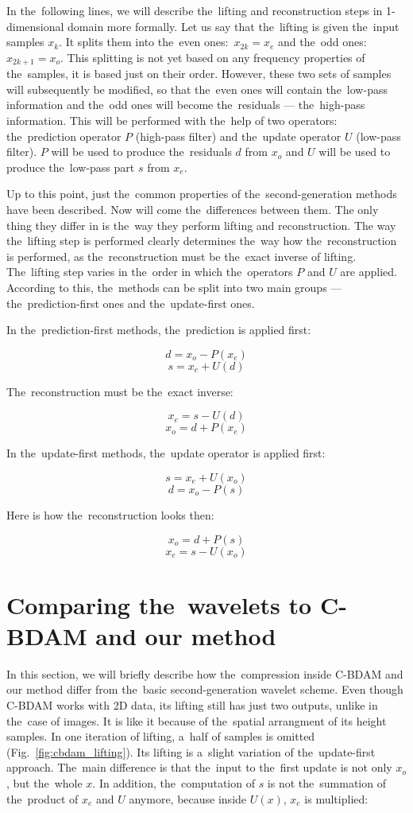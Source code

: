 In the~following lines, we will describe the~lifting and reconstruction steps in 1-dimensional domain more formally. Let us say that the~lifting is given the~input samples $x_k$. It splits them into the~even ones:~$x_{2k} = x_e$ and the~odd ones:~$x_{2k+1} = x_o$. This splitting is not yet based on any frequency properties of the~samples, it is based just on their order. However, these two sets of samples will subsequently be modified, so that the~even ones will contain the~low-pass information and the~odd ones will become the~residuals --- the~high-pass information. This will be performed with the~help of two operators: the~prediction operator $P$ (high-pass filter) and the~update operator $U$ (low-pass filter). $P$ will be used to produce the~residuals $d$ from $x_o$ and $U$ will be used to produce the~low-pass part $s$ from $x_e$.

Up to this point, just the~common properties of the~second-generation methods have been described. Now will come the~differences between them. The only thing they differ in is the~way they perform lifting and reconstruction. The way the~lifting step is performed clearly determines the~way how the~reconstruction is performed, as the~reconstruction must be the~exact inverse of lifting. The~lifting step varies in the~order in which the~operators $P$ and $U$ are applied. According to this, the~methods can be split into two main groups --- the~prediction-first ones and the~update-first ones.

In the~prediction-first methods, the~prediction is applied first:

$$d = x_o - P(x_e)$$
$$s = x_e + U(d)$$

The~reconstruction must be the~exact inverse:

$$x_e = s - U(d)$$
$$x_o = d + P(x_e)$$

In the~update-first methods, the~update operator is applied first:

$$s = x_e + U(x_o)$$
$$d = x_o - P(s)$$

Here is how the~reconstruction looks then:

$$x_o = d + P(s)$$
$$x_e = s - U(x_o)$$

\section{Comparing the~wavelets to C-BDAM and our method}\label{sec:wavelets_cbdam}

In this section, we will briefly describe how the~compression inside C-BDAM and our method differ from the~basic second-generation wavelet scheme. Even though C-BDAM works with 2D data, its lifting still has just two outputs, unlike in the~case of images. It is like it because of the~spatial arrangment of its height samples. In one iteration of lifting, a~half of samples is omitted (Fig.~\ref{fig:cbdam_lifting}). Its lifting is a~slight variation of the~update-first approach. The~main difference is that the~input to the~first update is not only $x_o$, but the~whole $x$. In addition, the~computation of $s$ is not the~summation of the~product of $x_e$ and $U$ anymore, because inside $U(x)$, $x_e$ is multiplied:


